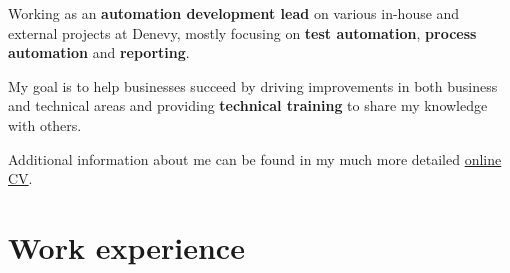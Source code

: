 \documentclass[cv_en.tex]{subfiles}
\begin{document}

\newcommand\minitab[2][l]{\begin{tabular}[b]{#1}#2\end{tabular}}
\newcommand\tnode[2][left]{\tikz[baseline=(n.center)]\node(n)[inner sep=0,outer sep=0,align=#1]{#2};}
\newcommand*{\cventrylogo}[8][.25em]{
  \begin{tabular*}{\textwidth}{l@{\extracolsep{\fill}}r}%
    \tnode{\minitab[l]{
      {\bfseries #4} \\ {\itshape #3\ifthenelse{\equal{#7}{}}{}{, #7}}
    }}
    & 
    \tnode[right]{\minitab[r]{{\bfseries #6} \\ {\itshape #2} \\ #5}} 
      \\%
  \end{tabular*}%
  \ifx&#8&%
    \else{\\\vbox{\small#8}}\fi%
  \par\addvspace{#1}}


\vspace*{-8mm}

Working as an \textbf{automation development lead} on various in-house and external projects at Denevy, mostly focusing on \textbf{test automation}, \textbf{process automation} and \textbf{reporting}. \\

\vspace*{-3mm}

My goal is to help businesses succeed by driving improvements in both business and technical areas and providing \textbf{technical training} to share my knowledge with others. \\

\vspace*{-3mm}

Additional information about me can be found in my much more detailed \href{https://dominik-97.github.io/curriculum-vitae/}{\color[RGB]{69,114,174}online CV}.

\section{Work experience}

\end{document}
